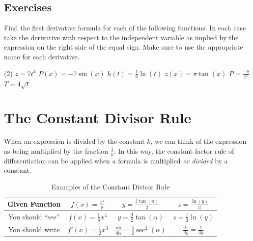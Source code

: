 \documentclass[12pt,]{book}
\theoremstyle{plain}
\theoremstyle{definition}
\numberwithin{equation}{section}
\newcommand{\fe}[2]{#1\mathopen{}\left(#2\right)\mathclose{}}
\newcommand{\fd}[1]{#1'}
\newcommand{\lz}[2]{\frac{d#1}{d#2}}
\begin{document}
\subsection[Exercises]{Exercises}\label{exercises-34}
Find the first derivative formula for each of the following functions.  In each case take the derivative with respect to the independent variable as implied by the expression on the right side of the equal sign.  Make sure to use the appropriate name for each derivative.%
\par
\begin{exercisegroup}(2)
\exercise[1.]\hypertarget{exercise-357}{\null}\(z=7t^4\)%
\exercise[2.]\hypertarget{exercise-358}{\null}\(\fe{P}{x}=-7\fe{\sin}{x}\)%
\exercise[3.]\hypertarget{exercise-359}{\null}\(\fe{h}{t}=\frac{1}{3}\fe{\ln}{t}\)%
\exercise[4.]\hypertarget{exercise-360}{\null}\(\fe{z}{x}=\pi\fe{\tan}{x}\)%
\exercise[5.]\hypertarget{exercise-361}{\null}\(P=\frac{-8}{t^4}\)%
\exercise[6.]\hypertarget{exercise-362}{\null}\(T=4\sqrt{t}\)%
\end{exercisegroup}
\par\smallskip\noindent
\typeout{************************************************}
\typeout{************************************************}
\section[The Constant Divisor Rule]{The Constant Divisor Rule}\label{section-constant-divisor-rule}
When an expression is divided by the constant \(k\), we can think of the expression as being multiplied by the fraction \(\frac{1}{k}\).  In this way, the constant factor rule of differentiation can be applied when a formula is multiplied \emph{or divided} by a constant.%
\begin{table}
\centering
\caption{Examples of the Constant Divisor Rule\label{table-constant-divisor-rule}}
\begin{tabular}{c|c|c|c}
\toprule
Given Function&\(\fe{f}{x}=\frac{x^4}{8}\)&\(y=\frac{3\fe{\tan}{\alpha}}{2}\)&\(z=\frac{\fe{\ln}{y}}{3}\)\\
\midrule
You should ``see''&\(\fe{f}{x}=\frac{1}{8}x^4\)&\(y=\frac{3}{2}\fe{\tan}{\alpha}\)&\(z=\frac{1}{3}\fe{\ln}{y}\)\\
\midrule
You should write&\(\fe{\fd{f}}{x}=\frac{1}{2}x^3\)&\(\lz{y}{\alpha}=\frac{3}{2}\fe{\sec^2}{\alpha}\)&\(\lz{z}{y}=\frac{1}{3y}\)\\
\bottomrule
\end{tabular}
\end{table}
\typeout{************************************************}
\typeout{************************************************}
\end{document}
